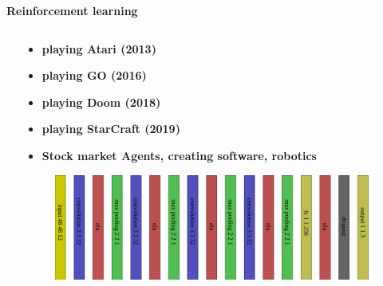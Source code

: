 \documentclass[xcolor=dvipsnames]{beamer}
\begin{document}
\begin{frame}{\bf Reinforcement learning}
\begin{columns}
\begin{column}{0.5\textwidth}
\end{column}
\begin{column}{0.5\textwidth}  %

      \begin{itemize}
      \item {\bf playing Atari (2013)}
      \item {\bf playing GO (2016)}
      \item {\bf playing Doom (2018)}
      \item {\bf playing StarCraft (2019)}
      \item {\bf Stock market Agents, creating software, robotics}
    \end{itemize}


    \begin{figure}[!htb]
      \centering
      \includegraphics[scale=0.09]{./diagrams/atari_network.png}
    \end{figure}

\end{column}
\end{columns}

\end{frame}
\end{document}
